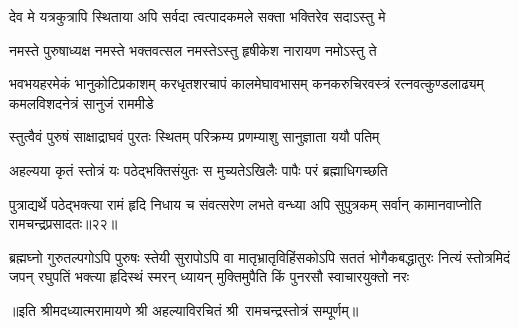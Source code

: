 \twolineshloka
{देव मे यत्रकुत्रापि स्थिताया अपि सर्वदा}
{त्वत्पादकमले सक्ता भक्तिरेव  सदाऽस्तु मे}%

\twolineshloka
{नमस्ते पुरुषाध्यक्ष नमस्ते भक्तवत्सल}
{नमस्तेऽस्तु हृषीकेश नारायण नमोऽस्तु ते}%

\fourlineindentedshloka
{भवभयहरमेकं भानुकोटिप्रकाशम्}
{करधृतशरचापं कालमेघावभासम्}
{कनकरुचिरवस्त्रं रत्नवत्कुण्डलाढ्यम्}
{कमलविशदनेत्रं सानुजं राममीडे}%

\twolineshloka
{स्तुत्वैवं पुरुषं साक्षाद्राघवं पुरतः स्थितम्}
{परिक्रम्य प्रणम्याशु सानुज्ञाता ययौ पतिम्}%

\twolineshloka
{अहल्यया कृतं स्तोत्रं यः पठेद्भक्तिसंयुतः}
{स मुच्यतेऽखिलैः पापैः परं ब्रह्माधिगच्छति}%

\twolineshloka
{पुत्राद्यर्थे पठेद्भक्त्या रामं हृदि निधाय च}
{संवत्सरेण लभते वन्ध्या अपि सुपुत्रकम्}%
{सर्वान् कामानवाप्नोति रामचन्द्रप्रसादतः॥२२॥}%

\fourlineindentedshloka
{ब्रह्मघ्नो गुरुतल्पगोऽपि पुरुषः स्तेयी सुरापोऽपि वा}
{मातृभ्रातृविहिंसकोऽपि सततं भोगैकबद्धातुरः}
{नित्यं स्तोत्रमिदं जपन्  रघुपतिं भक्त्या हृदिस्थं स्मरन्}
{ध्यायन् मुक्तिमुपैति किं पुनरसौ स्वाचारयुक्तो नरः}%

॥इति श्रीमदध्यात्मरामायणे श्री अहल्याविरचितं श्री~रामचन्द्रस्तोत्रं सम्पूर्णम्॥
